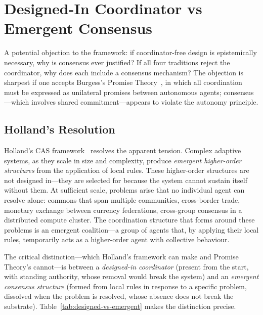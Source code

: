 \documentclass[11pt]{article}
\theoremstyle{definition}
\theoremstyle{plain}
\theoremstyle{plain}
\begin{document}
\section{Designed-In Coordinator vs Emergent Consensus}
\label{sec:emergent}

A potential objection to the framework: if coordinator-free design is
epistemically necessary, why is consensus ever justified? If all four
traditions reject the coordinator, why does each include a consensus
mechanism? The objection is sharpest if one accepts Burgess's Promise
Theory~\cite{burgess2018}, in which all coordination must be expressed as
unilateral promises between autonomous agents; consensus---which involves
shared commitment---appears to violate the autonomy principle.

\subsection{Holland's Resolution}

Holland's CAS framework~\cite{holland2012,holland1995} resolves the apparent
tension. Complex adaptive systems, as they scale in size and complexity,
produce \emph{emergent higher-order structures} from the application of local
rules. These higher-order structures are not designed in---they are selected
for because the system cannot sustain itself without them. At sufficient
scale, problems arise that no individual agent can resolve alone: commons
that span multiple communities, cross-border trade, monetary exchange
between currency federations, cross-group consensus in a distributed compute
cluster. The coordination structure that forms around these problems is an
emergent coalition---a group of agents that, by applying their local rules,
temporarily acts as a higher-order agent with collective behaviour.

The critical distinction---which Holland's framework can make and Promise
Theory's cannot---is between a \emph{designed-in coordinator} (present from
the start, with standing authority, whose removal would break the system)
and an \emph{emergent consensus structure} (formed from local rules in
response to a specific problem, dissolved when the problem is resolved,
whose absence does not break the substrate). Table~\ref{tab:designed-vs-emergent}
makes the distinction precise.
\end{document}
